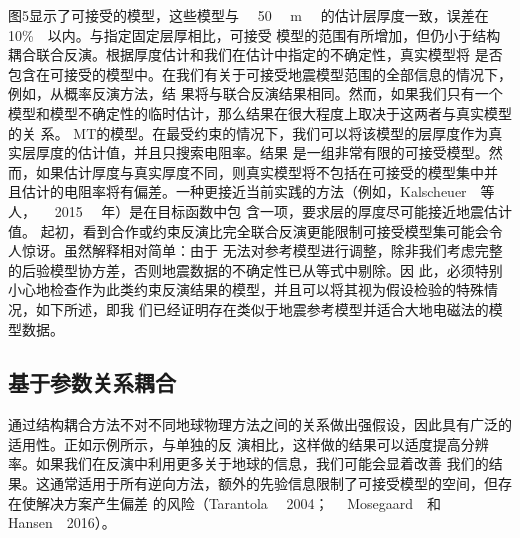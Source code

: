图5显示了可接受的模型，这些模型与   50   m   的估计层厚度一致，误差在   10\%  以内。与指定固定层厚相比，可接受 模型的范围有所增加，但仍小于结构耦合联合反演。根据厚度估计和我们在估计中指定的不确定性，真实模型将 是否包含在可接受的模型中。在我们有关于可接受地震模型范围的全部信息的情况下，例如，从概率反演方法，结 果将与联合反演结果相同。然而，如果我们只有一个模型和模型不确定性的临时估计，那么结果在很大程度上取决于这两者与真实模型的关 系。 MT的模型。在最受约束的情况下，我们可以将该模型的层厚度作为真实层厚度的估计值，并且只搜索电阻率。结果 是一组非常有限的可接受模型。然而，如果估计厚度与真实厚度不同，则真实模型将不包括在可接受的模型集中并 且估计的电阻率将有偏差。一种更接近当前实践的方法（例如，Kalscheuer  等人，   2015   年）是在目标函数中包 含一项，要求层的厚度尽可能接近地震估计值。 起初，看到合作或约束反演比完全联合反演更能限制可接受模型集可能会令人惊讶。虽然解释相对简单：由于 无法对参考模型进行调整，除非我们考虑完整的后验模型协方差，否则地震数据的不确定性已从等式中剔除。因 此，必须特别小心地检查作为此类约束反演结果的模型，并且可以将其视为假设检验的特殊情况，如下所述，即我 们已经证明存在类似于地震参考模型并适合大地电磁法的模型数据。

\subsection{基于参数关系耦合}

通过结构耦合方法不对不同地球物理方法之间的关系做出强假设，因此具有广泛的适用性。正如示例所示，与单独的反 演相比，这样做的结果可以适度提高分辨率。如果我们在反演中利用更多关于地球的信息，我们可能会显着改善 我们的结果。这通常适用于所有逆向方法，额外的先验信息限制了可接受模型的空间，但存在使解决方案产生偏差 的风险（Tarantola   2004；   Mosegaard  和   Hansen  2016）。

